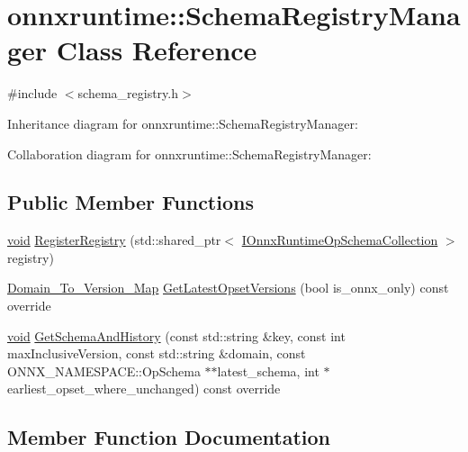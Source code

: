\hypertarget{classonnxruntime_1_1SchemaRegistryManager}{}\section{onnxruntime\+:\+:Schema\+Registry\+Manager Class Reference}
\label{classonnxruntime_1_1SchemaRegistryManager}


{\ttfamily \#include $<$schema\+\_\+registry.\+h$>$}



Inheritance diagram for onnxruntime\+:\+:Schema\+Registry\+Manager\+:


Collaboration diagram for onnxruntime\+:\+:Schema\+Registry\+Manager\+:
\subsection*{Public Member Functions}
\begin{DoxyCompactItemize}
\item 
\mbox{\hyperlink{mlasi_8h_a88f941d423cb2a819b70a1358982b1a6}{void}} \mbox{\hyperlink{classonnxruntime_1_1SchemaRegistryManager_a556cd4ab1757b655ce2b898c3b05c066}{Register\+Registry}} (std\+::shared\+\_\+ptr$<$ \mbox{\hyperlink{classonnxruntime_1_1IOnnxRuntimeOpSchemaCollection}{I\+Onnx\+Runtime\+Op\+Schema\+Collection}} $>$ registry)
\item 
\mbox{\hyperlink{namespaceonnxruntime_ab773a024322804641f5eb4964e3471d6}{Domain\+\_\+\+To\+\_\+\+Version\+\_\+\+Map}} \mbox{\hyperlink{classonnxruntime_1_1SchemaRegistryManager_a29610465c48d72b297860e28a2d73602}{Get\+Latest\+Opset\+Versions}} (bool is\+\_\+onnx\+\_\+only) const override
\item 
\mbox{\hyperlink{mlasi_8h_a88f941d423cb2a819b70a1358982b1a6}{void}} \mbox{\hyperlink{classonnxruntime_1_1SchemaRegistryManager_ae323ccc55079bbb8b6fedfd382ec2d30}{Get\+Schema\+And\+History}} (const std\+::string \&key, const int max\+Inclusive\+Version, const std\+::string \&domain, const O\+N\+N\+X\+\_\+\+N\+A\+M\+E\+S\+P\+A\+C\+E\+::\+Op\+Schema $\ast$$\ast$latest\+\_\+schema, int $\ast$earliest\+\_\+opset\+\_\+where\+\_\+unchanged) const override
\end{DoxyCompactItemize}


\subsection{Member Function Documentation}
\mbox{\label{classonnxruntime_1_1SchemaRegistryManager_a29610465c48d72b297860e28a2d73602}} 
